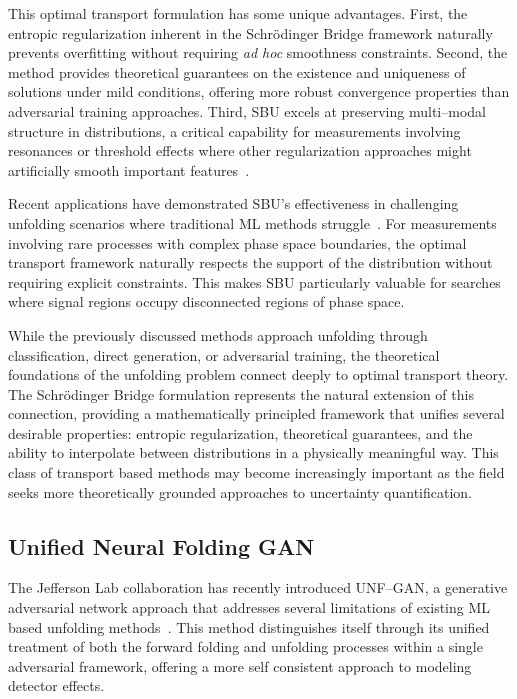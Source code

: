     This optimal transport formulation has some unique advantages.
    First, the entropic regularization inherent in the Schr\"odinger Bridge framework naturally prevents overfitting without requiring \textit{ad hoc} smoothness constraints.
    Second, the method provides theoretical guarantees on the existence and uniqueness of solutions under mild conditions, offering more robust convergence properties than adversarial training approaches.
    Third, SBU excels at preserving multi--modal structure in distributions, a critical capability for measurements involving resonances or threshold effects where other regularization approaches might artificially smooth important features~\cite{Butter2025GenerativeMapping}.
    
    Recent applications have demonstrated SBU's effectiveness in challenging unfolding scenarios where traditional ML methods struggle~\cite{Diefenbacher:2023wec}.
    For measurements involving rare processes with complex phase space boundaries, the optimal transport framework naturally respects the support of the distribution without requiring explicit constraints.
    This makes SBU particularly valuable for searches where signal regions occupy disconnected regions of phase space.

    While the previously discussed methods approach unfolding through classification, direct generation, or adversarial training, the theoretical foundations of the unfolding problem connect deeply to optimal transport theory.
    The Schr\"odinger Bridge formulation represents the natural extension of this connection, providing a mathematically principled framework that unifies several desirable properties: entropic regularization, theoretical guarantees, and the ability to interpolate between distributions in a physically meaningful way.
    This class of transport based methods may become increasingly important as the field seeks more theoretically grounded approaches to uncertainty quantification.

\subsection{Unified Neural Folding GAN}
    The Jefferson Lab collaboration has recently introduced UNF--GAN, a generative adversarial network approach that addresses several limitations of existing ML based unfolding methods~\cite{Alghamdi:2023emm}.
    This method distinguishes itself through its unified treatment of both the forward folding and unfolding processes within a single adversarial framework, offering a more self consistent approach to modeling detector effects.
    
